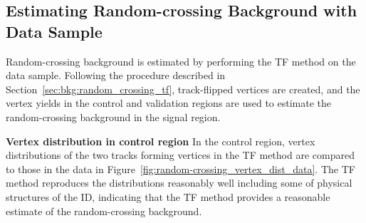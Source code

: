 \subsection{Estimating Random-crossing Background with Data Sample}
\label{sec:bkg:random_crossing_data}

Random-crossing background is estimated by performing the TF method on the data sample. Following the procedure described in Section~\ref{sec:bkg:random_crossing_tf}, track-flipped vertices are created, and the vertex yields in the control and validation regions are used to estimate the random-crossing background in the signal region.

\textbf{Vertex distribution in control region} In the control region, vertex distributions of the two tracks forming \xx vertices in the TF method are compared to those in the data in Figure~\ref{fig:random-crossing_vertex_dist_data}. The TF method reproduces the distributions reasonably well including some of physical structures of the ID, indicating that the TF method provides a reasonable estimate of the random-crossing background.

